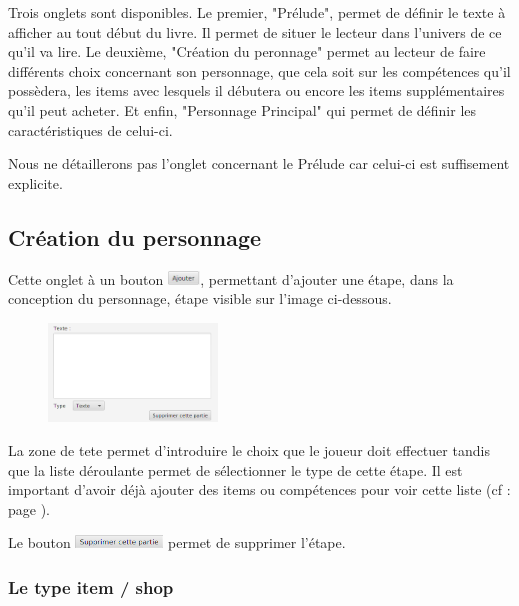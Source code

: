 		Trois onglets sont disponibles. Le premier, "Prélude", permet de définir le texte à afficher au tout début du livre. Il permet de situer le lecteur dans l'univers de ce qu'il va lire. Le deuxième, "Création du peronnage" permet au lecteur de faire différents choix concernant son personnage, que cela soit sur les compétences qu'il possèdera, les items avec lesquels il débutera ou encore les items supplémentaires qu'il peut acheter. Et enfin, "Personnage Principal" qui permet de définir les caractéristiques de celui-ci.

		Nous ne détaillerons pas l'onglet concernant le Prélude car celui-ci est suffisement explicite.

		\subsection{Création du personnage}
			Cette onglet à un bouton \includegraphics[height=10pt, keepaspectratio]{img/ajouterBouton.png}, permettant d'ajouter une étape, dans la conception du personnage, étape visible sur l'image ci-dessous.

			\begin{figure}[H]
				\centering\includegraphics[width=0.4\textwidth, keepaspectratio]{img/etapeConceptionPerso.png}
			\end{figure}

			La zone de tete permet d'introduire le choix que le joueur doit effectuer tandis que la liste déroulante permet de sélectionner le type de cette étape. Il est important d'avoir déjà ajouter des items ou compétences pour voir cette liste (cf :  page \pageref{chapter:elementsConstitutifLivre}).

			Le bouton \includegraphics[height=10pt, keepaspectratio]{img/preludeSupprimerBouton.png} permet de supprimer l'étape.

			\subsubsection{Le type item / shop}
				\label{subsubsec:item_shop}


